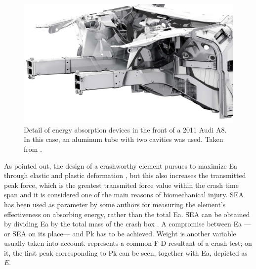 \documentclass[
documentsize = a4, %
font = cmr, %
typesize = 11, %
printmode = true,
onehalfspacing = true,
language = en, %
titlepage = udciccp, %
degree = pt, %
dedication = true,
acknowledgements = true,
abstract-en = true,
abstract-es = false,
abstract-ga = false,
epigraphs = true,
toc = true,
lof = true,
lot = true,
frontmatterintoc = false,
notation = false,
minimal = false,
]{UDCthesis}
\begin{document}
\begin{figure}
	\centering
	\includegraphics[width=0.7\linewidth]{IMG_CUTRES/audiA8detail}
	\caption[Detail of energy absorption devices in the front of a 2011 Audi A8.]{Detail of energy absorption devices in the front of a 2011 Audi A8. In this case, an aluminum tube with two cavities was used. Taken from \citep{audi}.}
	\label{fig:audiA8detail}
\end{figure}

As \citet{Hou2008} pointed out, the design of a crashworthy element pursues to maximize \gls{Ea} through elastic and plastic deformation \citep{Wu2006}, but this also increases the transmitted peak force, which is the greatest transmited force value within the crash time span and it is considered one of the main reasons of biomechanical injury. \Gls{SEA} has been used as parameter by some authors \citep{Lee2006, Peroni2009, Scattina2011} for measuring the element's effectiveness on absorbing energy, rather than the total \gls{Ea}. \Gls{SEA} can be obtained by dividing \gls{Ea} by the total mass of the crash box \citep{Lee2006, Peroni2009, Scattina2011}.  A compromise between \gls{Ea} ---or \gls{SEA} on its place--- and \gls{Pk} has to be achieved. Weight is another variable usually taken into account.  represents a common \gls{F-D} resultant of a crash test; on it, the first peak corresponding to \gls{Pk} can be seen, together with \gls{Ea}, depicted as $E$.
\end{document}
